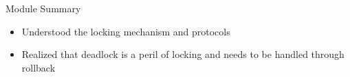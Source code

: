\documentclass[aspectratio=169, xcolor=dvipsnames]{beamer}
\begin{document}
\begin{frame}{Module Summary}
    \begin{itemize}[<+->]
        \item Understood the locking mechanism and protocols
        \item Realized that deadlock is a peril of locking and needs to be handled through rollback
    \end{itemize}
    \vspace{2em}
\end{frame}
\end{document}
